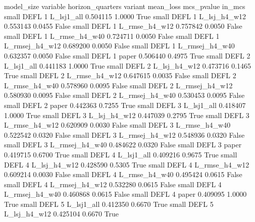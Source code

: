 model_size variable  horizon_quarters        variant  mean_loss  mcs_pvalue  in_mcs
     small     DEFL                 1     L_lsj1_all   0.504115      1.0000    True
     small     DEFL                 1   L_lsj_h4_w12   0.553143      0.0455   False
     small     DEFL                 1  L_rmse_h4_w12   0.757842      0.0050   False
     small     DEFL                 1  L_rmse_h4_w40   0.724711      0.0050   False
     small     DEFL                 1 L_rmsej_h4_w12   0.689200      0.0050   False
     small     DEFL                 1 L_rmsej_h4_w40   0.632357      0.0050   False
     small     DEFL                 1          paper   0.506440      0.4975    True
     small     DEFL                 2     L_lsj1_all   0.441183      1.0000    True
     small     DEFL                 2   L_lsj_h4_w12   0.473716      0.1465    True
     small     DEFL                 2  L_rmse_h4_w12   0.647615      0.0035   False
     small     DEFL                 2  L_rmse_h4_w40   0.578960      0.0095   False
     small     DEFL                 2 L_rmsej_h4_w12   0.580930      0.0095   False
     small     DEFL                 2 L_rmsej_h4_w40   0.530453      0.0095   False
     small     DEFL                 2          paper   0.442363      0.7255    True
     small     DEFL                 3     L_lsj1_all   0.418407      1.0000    True
     small     DEFL                 3   L_lsj_h4_w12   0.447039      0.2795    True
     small     DEFL                 3  L_rmse_h4_w12   0.620909      0.0030   False
     small     DEFL                 3  L_rmse_h4_w40   0.522542      0.0320   False
     small     DEFL                 3 L_rmsej_h4_w12   0.548936      0.0320   False
     small     DEFL                 3 L_rmsej_h4_w40   0.484622      0.0320   False
     small     DEFL                 3          paper   0.419715      0.6700    True
     small     DEFL                 4     L_lsj1_all   0.409216      0.9675    True
     small     DEFL                 4   L_lsj_h4_w12   0.428590      0.5305    True
     small     DEFL                 4  L_rmse_h4_w12   0.609214      0.0030   False
     small     DEFL                 4  L_rmse_h4_w40   0.495424      0.0615   False
     small     DEFL                 4 L_rmsej_h4_w12   0.532280      0.0615   False
     small     DEFL                 4 L_rmsej_h4_w40   0.460868      0.0615   False
     small     DEFL                 4          paper   0.409095      1.0000    True
     small     DEFL                 5     L_lsj1_all   0.412350      0.6670    True
     small     DEFL                 5   L_lsj_h4_w12   0.425104      0.6670    True
